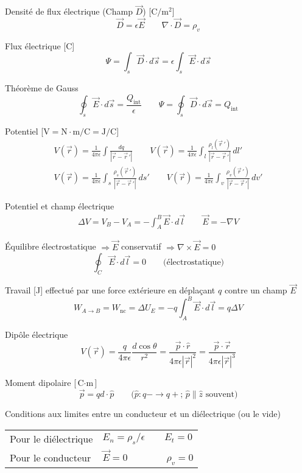 \documentclass[10pt,landscape]{article}
\newcommand{\halfline}{\vspace{0.5em}}
\newcommand{\tableindent}{\hspace{1.5em}}
\newcommand{\uvec}[1]{\ensuremath{{\hat{#1}}}}
\begin{document}
\begin{multicols}{3}
Densité de flux électrique (Champ $\vec{D}$)  [$\si{\coulomb/\metre^2}$]
\[ \vec{D} = \epsilon\vec{E}
\qquad \nabla \cdot \vec{D} = \rho_v \]

Flux électrique [\si{\coulomb}]
\[  \Psi = \int_{s} \vec{D} \cdot d\vec{s} = \epsilon \int_{s} \vec{E} \cdot d\vec{s} \]

Théorème de Gauss
\[ \oint_s \vec{E}\cdot d\vec{s} = \frac{Q_\text{int}}{\epsilon}
\qquad  \Psi = \oint_s \vec{D}\cdot d\vec{s} = Q_\text{int} \]

Potentiel [$\si{\volt} = \si{\newton\cdot\metre/\coulomb} = \si{\joule/\coulomb}$]
\begin{gather*}
V(\vec{r}) = \frac{1}{4\pi\epsilon} \int \frac{dq}{| \vec{r} - \vec{r}\,' | }  \qquad
V(\vec{r}) = \frac{1}{4\pi\epsilon} \int_{l} \frac{\rho_l(\vec{r}\,')}{| \vec{r} - \vec{r}\,' | } \,dl'  \\
V(\vec{r}) = \frac{1}{4\pi\epsilon} \int_{s} \frac{\rho_s(\vec{r}\,')}{| \vec{r} - \vec{r}\,'| } \,ds'  \qquad
V(\vec{r}) = \frac{1}{4\pi\epsilon} \int_{v} \frac{\rho_v(\vec{r}\,')}{| \vec{r} - \vec{r}\,' | } \,dv'  
\end{gather*}

Potentiel et champ électrique
\begin{gather*}
\Delta V = V_B - V_A  = -\int_A^B \vec{E}\cdot d\vec{l} \qquad
 \vec{E} = -\nabla V
\end{gather*}

Équilibre électrostatique $\Rightarrow \vec{E}$ conservatif  $\Rightarrow \nabla \times \vec{E} = 0$
\[  \oint_C \vec{E}\cdot d\vec{l}  = 0 \qquad \text{(électrostatique)}\]

Travail [\si{\joule}] effectué par une force extérieure en déplaçant $q$ contre un champ $\vec{E}$
\[ W_{A\to B} = W_\text{nc} = \Delta U_E = -q\int_{A}^{B} \vec{E}\cdot d\vec{l} = q\Delta V \]

Dipôle électrique
\[ V(\vec{r}) = \frac{q}{4\pi\epsilon} \frac{d\cos\theta}{r^2} =
\frac{\vec{p}\cdot\uvec{r}}{4\pi\epsilon|\vec{r}|^2} =
\frac{\vec{p}\cdot\vec{r}}{4\pi\epsilon|\vec{r}|^3} \]

Moment dipolaire [$\si{\coulomb\cdot\meter}$]
\[ \vec{p} = qd\cdot \uvec{p} \qquad \text{($\uvec{p}: q- \to q+$;  $\uvec{p}\parallel\uvec{z}$ souvent)} \]

\halfline
Conditions aux limites entre un conducteur et un diélectrique  (ou le vide)\\
\halfline
\begin{tabular}{@{\tableindent}ll@{}}
	Pour le diélectrique & $ E_n = {\rho_s}/{\epsilon} \qquad E_t = 0 $ \\
	Pour le conducteur  & $\vec{E} = 0 \qquad\qquad \rho_v = 0 $ \\
\end{tabular}


\end{multicols}
\end{document}
